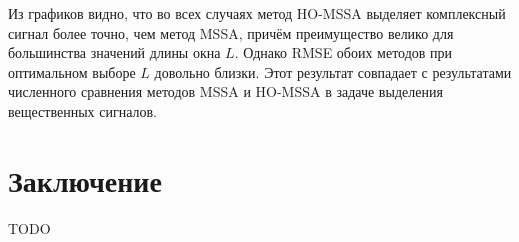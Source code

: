 \documentclass[specialist,
  substylefile=spbu_report.rtx,
subf,href,colorlinks=true, 12pt]{disser}
\theoremstyle{plain}
\theoremstyle{definition}
\theoremstyle{remark}
\begin{document}
Из графиков видно, что во всех случаях метод HO-MSSA выделяет
комплексный сигнал более точно, чем метод MSSA,
причём преимущество велико для большинства значений длины окна $L$.
Однако RMSE обоих методов при оптимальном выборе $L$ довольно близки.
Этот результат совпадает с результатами численного сравнения методов MSSA и
HO-MSSA в задаче выделения вещественных сигналов.

\newpage

\section{Заключение}\label{sec:conclusion}
TODO






\end{document}
